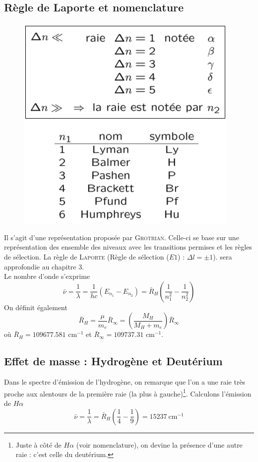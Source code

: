 \subsection{Règle de Laporte et nomenclature}
	\begin{figure}
	\vspace{-5mm}
	\includegraphics[scale=0.4]{ch1/image5}
	\end{figure}
Il s'agit d'une représentation proposée par \textsc{Grotrian}. Celle-ci se base sur une représentation des
ensemble des niveaux avec les transitions permises et les règles de sélection. La règle de \textsc{Laporte} 
(Règle de sélection ($E1$) : $\Delta l = \pm 1$). sera approfondie au chapitre 3. \\

Le nombre d'onde s'exprime
\begin{equation}
\bar \nu = \frac{1}{\lambda} = \frac{1}{hc}(E_{n_1}-E_{n_2}) = \bar R_H\left(\frac{1}{n^2_1}-\frac{1}{n^2_2}
\right)
\end{equation}
On définit également
\begin{equation}
\bar{R}_H = \frac{\mu}{m_e}\bar{R}_\infty = \left(\frac{M_H}{M_H+m_e}\right)\bar{R}_\infty
\end{equation}
où $\bar{R}_H = 109677.581$ cm$^{-1}$ et $\bar{R}_\infty = 109737.31$ cm$^{-1}$.



\subsection{Effet de masse : Hydrogène et Deutérium}
Dans le spectre d'émission de l'hydrogène, on remarque que l'on a une raie très proche aux alentours de la
première raie (la plus à gauche)\footnote{Juste à côté de $H\alpha$ (voir nomenclature), on devine la présence
d'une autre raie : c'est celle du deutérium.}. Calculons l'émission de $H\alpha$
\begin{equation}
\bar\nu = \frac{1}{\lambda}= \bar{R}_H\left(\frac{1}{4}-\frac{1}{9}\right) = 15237\ \text{cm}^{-1}
\end{equation}

